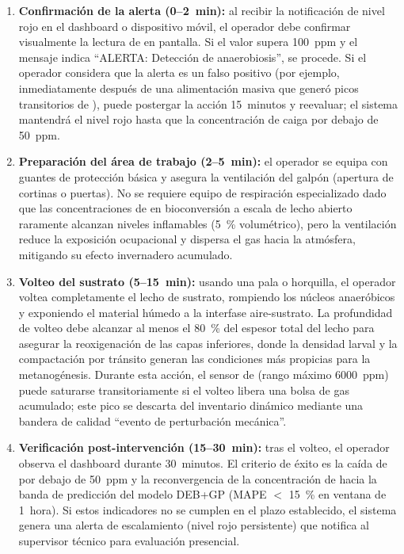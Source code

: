 \begin{enumerate}
    \item \textbf{Confirmación de la alerta (\num{0}--\num{2}~min):} al recibir la notificación de nivel rojo en el dashboard o dispositivo móvil, el operador debe confirmar visualmente la lectura de  en pantalla. Si el valor supera \num{100}~ppm y el mensaje indica ``ALERTA: Detección de anaerobiosis'', se procede. Si el operador considera que la alerta es un falso positivo (por ejemplo, inmediatamente después de una alimentación masiva que generó picos transitorios de ), puede postergar la acción \num{15}~minutos y reevaluar; el sistema mantendrá el nivel rojo hasta que la concentración de  caiga por debajo de \num{50}~ppm.
    
    \item \textbf{Preparación del área de trabajo (\num{2}--\num{5}~min):} el operador se equipa con guantes de protección básica y asegura la ventilación del galpón (apertura de cortinas o puertas). No se requiere equipo de respiración especializado dado que las concentraciones de  en bioconversión a escala de lecho abierto raramente alcanzan niveles inflamables (\num{5}~\% volumétrico), pero la ventilación reduce la exposición ocupacional y dispersa el gas hacia la atmósfera, mitigando su efecto invernadero acumulado.
    
    \item \textbf{Volteo del sustrato (\num{5}--\num{15}~min):} usando una pala o horquilla, el operador voltea completamente el lecho de sustrato, rompiendo los núcleos anaeróbicos y exponiendo el material húmedo a la interfase aire-sustrato. La profundidad de volteo debe alcanzar al menos el \num{80}~\% del espesor total del lecho para asegurar la reoxigenación de las capas inferiores, donde la densidad larval y la compactación por tránsito generan las condiciones más propicias para la metanogénesis. Durante esta acción, el sensor de  (rango máximo \num{6000}~ppm) puede saturarse transitoriamente si el volteo libera una bolsa de gas acumulado; este pico se descarta del inventario dinámico mediante una bandera de calidad ``evento de perturbación mecánica''.
    
    \item \textbf{Verificación post-intervención (\num{15}--\num{30}~min):} tras el volteo, el operador observa el dashboard durante \num{30}~minutos. El criterio de éxito es la caída de  por debajo de \num{50}~ppm y la reconvergencia de la concentración de  hacia la banda de predicción del modelo DEB+GP (MAPE $<$ \num{15}~\% en ventana de \num{1}~hora). Si estos indicadores no se cumplen en el plazo establecido, el sistema genera una alerta de escalamiento (nivel rojo persistente) que notifica al supervisor técnico para evaluación presencial.
\end{enumerate}


